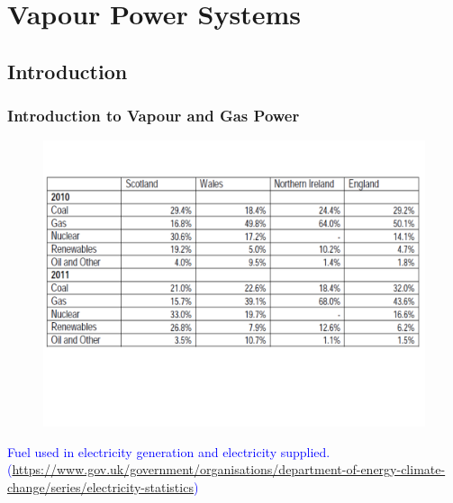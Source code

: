 \documentclass[10pt,compress,handout,ignorenonframetext]{beamer}
\begin{document}
\section{Vapour Power Systems}

\subsection{Introduction}



\begin{frame}
 \frametitle{Introduction to Vapour and Gas Power}
    \begin{figure}%
     \begin{center}
      \includegraphics[width=9.cm,clip]{./Pics/Energy_Share_UK}
     \end{center}
    \end{figure}
\vspace{-2cm}
\textcolor{blue}{Fuel used in electricity generation and electricity supplied. (\href{https://www.gov.uk/government/organisations/department-of-energy-climate-change/series/electricity-statistics}{https://www.gov.uk/government/organisations/department-of-energy-climate-change/series/electricity-statistics})}
 \normalsize
\end{frame}
\end{document}
